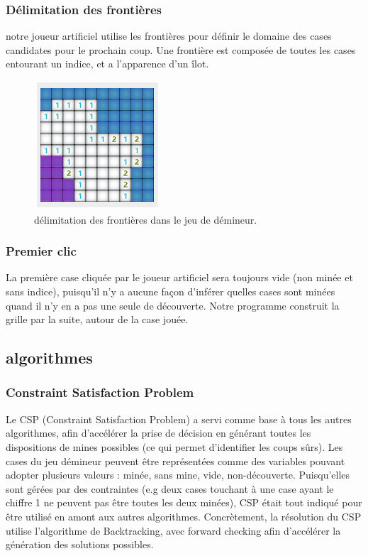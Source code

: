 \documentclass{article}
\begin{document}
\subsubsection{Délimitation des frontières}
notre joueur artificiel utilise les frontières pour définir 
le domaine des cases candidates pour le prochain coup. Une frontière est 
composée de toutes les cases entourant un indice, et a l’apparence d’un îlot.
                \begin{figure}[h!]
			\caption {délimitation des frontières dans le jeu de démineur.}
                \centering
                \includegraphics[scale=.5]{./demineur_2.png}
                \end{figure}

\subsubsection{Premier clic}
La première case cliquée par le joueur artificiel sera 
toujours vide (non minée et sans indice), puisqu’il n’y a aucune façon 
d’inférer quelles cases sont minées quand il n’y en a pas une seule de 
découverte. Notre programme construit la grille par la suite, autour de la case jouée.

\subsection{algorithmes}
\subsubsection{Constraint Satisfaction Problem}
Le CSP (Constraint Satisfaction Problem) a servi comme base à tous 
les autres algorithmes, afin d’accélérer la prise de décision en générant 
toutes les dispositions de mines possibles (ce qui permet d’identifier les coups sûrs). 
Les cases du jeu démineur peuvent être représentées comme des variables pouvant adopter 
plusieurs valeurs : minée, sans mine, vide, non-découverte. Puisqu’elles sont gérées 
par des contraintes (e.g deux cases touchant à une case ayant le chiffre 1 ne peuvent 
pas être toutes les deux minées), CSP était tout indiqué pour être utilisé en amont aux autres algorithmes.
Concrètement, la résolution du CSP utilise l'algorithme de Backtracking, avec forward checking afin d’accélérer la génération 
des solutions possibles.
\end{document}
